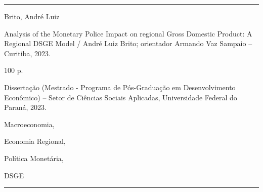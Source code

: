 \documentclass[
thesis.tex
]{subfiles}
\begin{document}
	\newpage
	
	\null
	\vfill
	\hrule
	\vspace*{-0.3cm}
	
	{\singlespacing
		
	Brito, André Luiz

	\hspace{0.5cm} Analysis of the Monetary Police Impact on regional Gross Domestic Product: A Regional DSGE Model / André Luiz Brito; orientador Armando Vaz Sampaio -- Curitiba, 2023.
	
	\hspace{0.5cm} 100 p.
	
	\hspace{0.5cm} Dissertação (Mestrado - Programa de Pós-Graduação em Desenvolvimento Econômico) -- Setor de Ciências Sociais Aplicadas, Universidade Federal do Paraná, 2023.
	
	\hspace{0.5cm} 
	\begin{enumerate*}[label=\arabic*.]
		\item Macroeconomia, 
		\item Economia Regional, 
		\item Política Monetária,
		\item DSGE
	\end{enumerate*}		
	
	}	
		
	\vspace*{0.5cm}
	
	\hrule
	
	\vspace*{1cm}
	
	\thispagestyle{empty}
	
\end{document}
